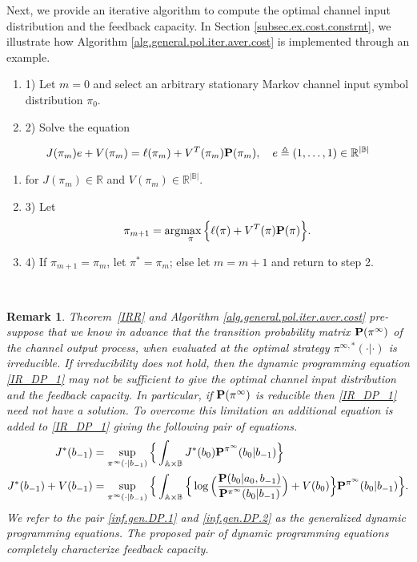 \documentclass[11pt, a4paper, journal,onecolumn]{IEEEtran}
\newcommand{\mb}{\mathbb}
\newcommand{\ben}{\begin{enumerate}}
\newcommand{\een}{\end{enumerate}}
\newcommand{\argmax}{\arg\!\max}
\newcommand{\noi}{\noindent}
\newtheorem{remark}{Remark}[section]
\begin{document}
Next, we provide an iterative algorithm to compute the optimal channel input distribution and the feedback capacity. In Section \ref{subsec.ex.cost.constrnt}, we illustrate how Algorithm \ref{alg.general.pol.iter.aver.cost} is implemented through an example.\\
\begin{algorithm}
\caption{}
\noi
\ben
\item[1)] Let $m=0$ and select an arbitrary stationary Markov channel input symbol distribution $\pi_0$.
\item[2)]  Solve the equation\een
\begin{equation}
J(\pi_m)e+V(\pi_m)=\ell(\pi_m)+V^T(\pi_m){\bf P}(\pi_m),\quad e\triangleq (1,\dots,1)\in \mathbb{R}^{|\mathbb{B}|}
\end{equation}\ben
\item[]for $J(\pi_m)\in \mathbb{R}$ and $V(\pi_m)\in \mathbb{R}^{|\mathbb{B}|}$. 
\item[3)]   Let 
\begin{equation}
\pi_{m+1}=\argmax_{\pi} \Big\{\ell(\pi)+V^T(\pi){\bf P}(\pi)\Big\}.
\end{equation} 
\item[4)] If $\pi_{m+1}=\pi_m$, let $\pi^*=\pi_m$; else let $m=m+1$ and return to step 2.  
\een
\label{alg.general.pol.iter.aver.cost}
\end{algorithm}
\noi \\


\begin{remark}\label{rem_inf4}
Theorem~\ref{IRR} and  Algorithm \ref{alg.general.pol.iter.aver.cost} pre-suppose that we  know in advance that the transition probability matrix ${\bf P}(\pi^\infty)$  of the channel output process, when evaluated at the optimal strategy $\pi^{\infty,*}(\cdot|\cdot)$ is irreducible. If irreducibility does not hold, then the dynamic programming equation \eqref{IR_DP_1} may not be sufficient to give the optimal channel input distribution and  the feedback capacity. In particular, if ${\bf P}(\pi^\infty)$ is reducible then \eqref{IR_DP_1} need not have a solution. To overcome this limitation an additional equation is added to \eqref{IR_DP_1} giving the following pair of equations.
\begin{align}
J^*(b_{-1})&=\sup_{\pi^\infty(\cdot|b_{-1})}\Big\{\int_{{\mb A}\times {\mb B}}J^*(b_0){\bf P}^{\pi^\infty}(b_0|b_{-1})\Big\}\label{inf.gen.DP.1}\\
J^*(b_{-1})+V(b_{-1})&=\sup_{\pi^\infty(\cdot|b_{-1})}\Big\{\int_{{\mb A}\times {\mb  B}}\Big\{\log\Big(\frac{{\bf P}(b_0|a_0,b_{-1})}{{\bf P}^{\pi^\infty}(b_0|b_{-1})}\Big)+V(b_0)\Big\}{\bf P}^{\pi^\infty}(b_0|b_{-1})\Big\}.\label{inf.gen.DP.2}
\end{align}
We refer to the pair \eqref{inf.gen.DP.1} and  \eqref{inf.gen.DP.2} as the generalized  dynamic programming equations. The proposed pair of dynamic programming equations completely characterize feedback capacity. 
\end{remark}
\end{document}
